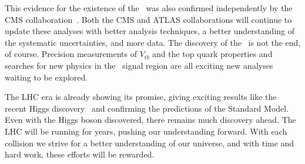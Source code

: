 This evidence for the existence of the \Wtchan\ was also confirmed independently by the CMS collaboration~\cite{CMSEVIDENCE}. Both the CMS and ATLAS collaborations will continue to update these analyses with better analysis techniques, a better understanding of the systematic uncertainties, and more data. The discovery of the \Wtchan\ is not the end, of course. Precision measurements of $V_{tb}$ and the top quark properties and searches for new physics in the \Wtchan\ signal region are all exciting new analyses waiting to be explored.

The LHC era is already showing its promise, giving exciting results like the recent Higgs discovery~\cite{HiggsATLAS,HiggsCMS} and confirming the predictions of the Standard Model. Even with the Higgs boson discovered, there remains much discovery ahead. The LHC will be running for years, pushing our understanding forward. With each collision we strive for a better understanding of our universe, and with time and hard work, these efforts will be rewarded.
